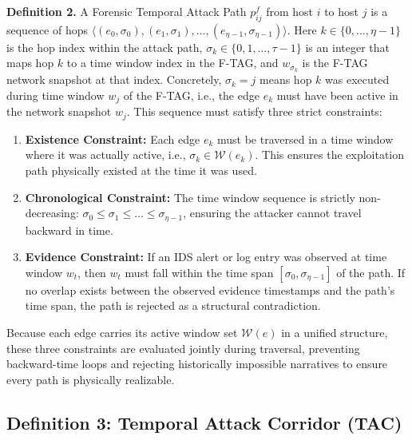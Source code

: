 \documentclass[12pt]{article}
\begin{document}
\textbf{Definition 2.} A Forensic Temporal Attack Path $p^f_{ij}$ from host $i$ to host $j$ is a sequence of hops $\langle (e_0, \sigma_0), (e_1, \sigma_1), \dots, (e_{\eta-1}, \sigma_{\eta-1}) \rangle$. Here $k \in \{0, \dots, \eta-1\}$ is the hop index within the attack path, $\sigma_k \in \{0, 1, \dots, \tau-1\}$ is an integer that maps hop $k$ to a time window index in the F-TAG, and $w_{\sigma_k}$ is the F-TAG network snapshot at that index. Concretely, $\sigma_k = j$ means hop $k$ was executed during time window $w_j$ of the F-TAG, i.e., the edge $e_k$ must have been active in the network snapshot $w_j$. This sequence must satisfy three strict constraints:
\begin{enumerate}
    \item \textbf{Existence Constraint:} Each edge $e_k$ must be traversed in a time window where it was actually active, i.e., $\sigma_k \in \mathcal{W}(e_k)$. This ensures the exploitation path physically existed at the time it was used.
    \item \textbf{Chronological Constraint:} The time window sequence is strictly non-decreasing: $\sigma_0 \le \sigma_1 \le \dots \le \sigma_{\eta-1}$, ensuring the attacker cannot travel backward in time.
    \item \textbf{Evidence Constraint:} If an IDS alert or log entry was observed at time window $w_t$, then $w_t$ must fall within the time span $[\sigma_0, \sigma_{\eta-1}]$ of the path. If no overlap exists between the observed evidence timestamps and the path's time span, the path is rejected as a structural contradiction.
\end{enumerate}

Because each edge carries its active window set $\mathcal{W}(e)$ in a unified structure, these three constraints are evaluated jointly during traversal, preventing backward-time loops and rejecting historically impossible narratives to ensure every path is physically realizable.

\subsection{Definition 3: Temporal Attack Corridor (TAC)}\label{sec:tac}
\end{document}
